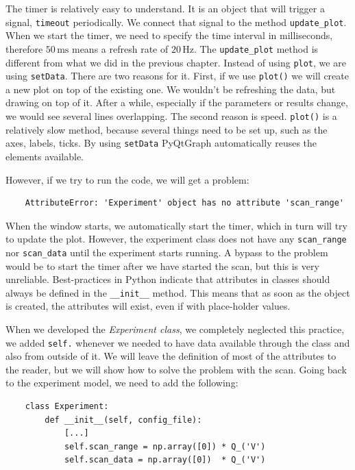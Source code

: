 The timer is relatively easy to understand. It is an object that will trigger a signal, \texttt{timeout} periodically. We connect that signal to the method \texttt{update\_plot}. When we start the timer, we need to specify the time interval in milliseconds, therefore $50\,\textrm{ms}$ means a refresh rate of $20\,\textrm{Hz}$. The \texttt{update\_plot} method is different from what we did in the previous chapter. Instead of using \texttt{plot}, we are using \texttt{setData}. There are two reasons for it. First, if we use \texttt{plot()} we will create a new plot on top of the existing one. We wouldn't be refreshing the data, but drawing on top of it. After a while, especially if the parameters or results change, we would see several lines overlapping. The second reason is speed. \texttt{plot()} is a relatively slow method, because several things need to be set up, such as the axes, labels, ticks. By using \texttt{setData} PyQtGraph automatically reuses the elements available.

However, if we try to run the code, we will get a problem:

\begin{verbatim}
    AttributeError: 'Experiment' object has no attribute 'scan_range'
\end{verbatim}


When the window starts, we automatically start the timer, which in turn will try to update the plot. However, the experiment class does not have any \texttt{scan\_range} nor \texttt{scan\_data} until the experiment starts running. A bypass to the problem would be to start the timer after we have started the scan, but this is very unreliable. Best-practices in Python indicate that attributes in classes should always be defined in the \texttt{\_\_init\_\_} method. This means that as soon as the object is created, the attributes will exist, even if with place-holder values.

When we developed the \emph{Experiment class}, we completely neglected this practice, we added \texttt{self.} whenever we needed to have data available through the class and also from outside of it. We will leave the definition of most of the attributes to the reader, but we will show how to solve the problem with the scan. Going back to the experiment model, we need to add the following:

\begin{verbatim}
    class Experiment:
        def __init__(self, config_file):
            [...]
            self.scan_range = np.array([0]) * Q_('V')
            self.scan_data = np.array([0])  * Q_('V')
\end{verbatim}

